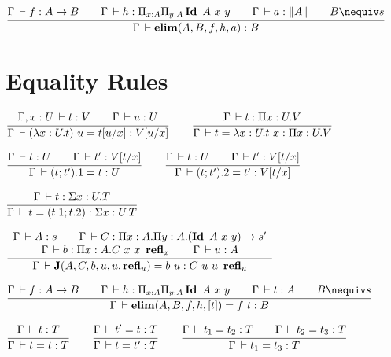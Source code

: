 \documentclass[a4paper,english]{lipics-utf8x}
\begin{document}
  \begin{center}
  \(
    \ru{\Gamma \der f : A \to B \qquad
        \Gamma \der h : \Pi_{x:A} \Pi_{y:A} \Id A\ x\ y \qquad
        \Gamma \der a : \squash{A} \qquad
        B \nequiv s
      }{\Gamma \der \elim(A,B,f,h,a) : B}
  \)
  \end{center}

  \section{Equality Rules}


  \begin{center}
  \(
    \ru{\Gamma, x:U \der t:V \qquad
        \Gamma \der u : U
      }{\Gamma \der (\lambda x:U.t)~u = t[u/x] : V[u/x]}
    \qquad
    \ru{\Gamma \der t : \Pi x:U.V
      }{\Gamma \der t = \lambda x:U.t~x : \Pi x:U.V}
  \)
  \end{center}

  \begin{center}
  \(
    \ru{\Gamma \der t : U \qquad
        \Gamma \der t' : V[t/x]
      }{\Gamma \der (t;t').1 = t : U}
    \qquad
    \ru{\Gamma \der t : U \qquad
        \Gamma \der t' : V[t/x]
      }{\Gamma \der (t;t').2 = t' : V[t/x]}
  \)
  \end{center}

  \begin{center}
  \(
    \ru{\Gamma \der t : \Sigma x:U.T
      }{\Gamma \der t = (t.1 ; t.2) : \Sigma x:U.T}
  \)
  \end{center}

  \begin{center}
  \(
    \dru{\Gamma \der A : s \qquad
         \Gamma \der C : \Pi x:A. \Pi y:A. (\Id A\ x\ y) \to s'
       }{\Gamma \der b : \Pi x:A. C\ x\ x\ \refl_x \qquad
         \Gamma \der u : A
       }{\Gamma \der \J (A,C,b,u,u,\refl_u) = b\ u : C\ u\ u\ \refl_u}
  \)
  \end{center}

  \begin{center}
  \(
    \ru{\Gamma \der f : A \to B \qquad
        \Gamma \der h : \Pi_{x:A} \Pi_{y:A} \Id A\ x\ y \qquad
        \Gamma \der t : A \qquad
        B \nequiv s
      }{\Gamma \der \elim(A,B,f,h,[t]) = f\ t : B}
  \)
  \end{center}


  \begin{center}
  \(
    \ru{\Gamma \der t : T
      }{\Gamma \der t = t : T}
    \qquad
    \ru{\Gamma \der t' = t : T
      }{\Gamma \der t = t' : T}
    \qquad
    \ru{\Gamma \der t_1 = t_2 : T \qquad
        \Gamma \der t_2 = t_3 : T
      }{\Gamma \der t_1 = t_3 : T}
  \)
  \end{center}
\end{document}
